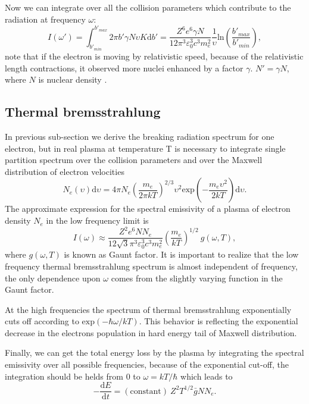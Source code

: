 \documentclass[oneside,a4paper,11pt]{report}
\begin{document}
Now we can integrate over all the collision parameters which contribute to the radiation at frequency 
$\omega$: 
\begin{equation}
 \label{brems_final}
I(\omega') = \int_{b'_{min}}^{b'_{max}} 2 \pi b' \gamma N \upsilon K \mathrm{d}b' = \frac{Z^6 e^6 \gamma N}{12\pi^3 \varepsilon_0^3 c^3 m_e^2} \frac{1}{\upsilon} \mathrm{ln}\left ( \frac{b'_{max}}{b'_{min}} \right ),
\end{equation}
note that if the electron is moving by relativistic speed, because of the relativistic length contractions,
it observed more nuclei enhanced by a factor $\gamma$. $N' = \gamma N$, where $N$ is nuclear density .   

\subsection{Thermal bremsstrahlung}
In previous sub-section we derive the breaking radiation spectrum for one electron, but in real plasma 
at temperature T is necessary to integrate single partition spectrum over the collision parameters 
and over the Maxwell distribution of electron velocities 
\begin{equation}
\label{them_brems}
N_e(\upsilon)\mathrm{d}\upsilon = 4 \pi N_e \left ( \frac{m_e}{2 \pi k T} \right )^{2/3}\upsilon^2 \mathrm{exp}\left ( -\frac{m_e \upsilon^2}{2kT} \right ) \mathrm{d}\upsilon . 
\end{equation}
The approximate expression for the spectral emissivity of a plasma of electron density $N_e$ in the low 
frequency limit is 
\begin{equation}
 \label{low_f_tbrem}
I(\omega)\approx \frac{Z^2e^6NN_e}{12\sqrt{3}\pi^3\varepsilon_0^3c^3m_e^2}\left ( \frac{m_e}{kT} \right )^{1/2} \: g(\omega,T),
\end{equation}
where $g(\omega , T)$ is known as Gaunt factor.
It is important to realize that the low frequency thermal bremsstrahlung spectrum is almost independent of 
frequency, the only dependence upon $\omega$ comes from the slightly varying function in the Gaunt factor. 

At the high frequencies the spectrum of thermal bremsstrahlung exponentially cuts off according to 
$\mathrm{exp}(-\hbar \omega / kT)$. This behavior is reflecting the exponential decrease in the 
electrons population in hard energy tail of Maxwell distribution. 

Finally, we can get the total energy loss by the plasma by integrating the spectral emissivity over 
all possible frequencies, because of the exponential cut-off, the integration should be helds from $0$ to 
$\omega = kT/ \hbar$ which leads to 
\begin{equation}
 \label{brem4}
-\frac{\mathrm{d}E}{\mathrm{d}t} = \mathrm{(constant)} \: Z^2T^{1/2}\bar{g}N N_e .
\end{equation}
\end{document}
